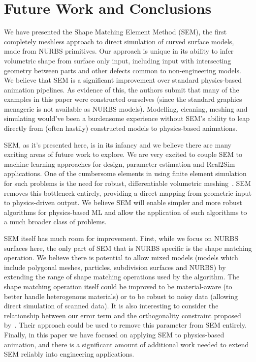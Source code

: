 \section{Future Work and Conclusions}
We have presented the Shape Matching Element Method (SEM), the first completely meshless approach to direct simulation of curved surface models, made from NURBS primitives.
Our approach is unique in its ability to infer volumetric shape from surface only input,
including input with intersecting geometry between parts and other defects common to non-engineering models.
We believe that SEM is a significant improvement over standard physics-based animation pipelines. 
As evidence of this, the authors submit that many of the examples in this paper were constructed ourselves
(since the standard graphics menagerie is not available as NURBS models). 
Modelling, cleaning, meshing and simulating would've been a burdensome experience without SEM's
ability to leap directly from (often hastily) constructed models to physics-based animations.

SEM, as it's presented here, is in its infancy and we believe there are many exciting areas of future work to explore.
We are very excited to couple SEM to machine learning approaches for design, parameter estimation and Real2Sim applications.
One of the cumbersome elements in using finite element simulation for such problems is the need for robust, differentiable volumetric meshing~\cite{gao2020deftet}.
SEM removes this bottleneck entirely, providing a direct mapping from geometric input to physics-driven output. 
We believe SEM will enable simpler and more robust algorithms for  physics-based ML and 
allow the application of such algorithms to a much broader class of problems. 

SEM itself has much room for improvement. 
First, while we focus on NURBS surfaces here, the only part of SEM that is NURBS specific is the shape matching operation.
We believe there is potential to allow mixed models (models which include polygonal meshes, particles, subdivision surfaces and NURBS)
by extending the range of shape matching operations used by the algorithm. The shape matching operation itself could be improved to be material-aware 
(to better handle heterogenous materials) or to be robust to noisy data (allowing direct simulation of scanned data).
 
It is also interesting to consider the relationship between our error term and the orthogonality constraint proposed by~\citet{Zhang:CompDynamics:2020}. 
Their approach could be used to remove this parameter from SEM entirely.
Finally, in this paper we have focused on applying SEM to physics-based animation, and there is a significant amount of additional work needed to 
extend SEM reliably into engineering applications.

